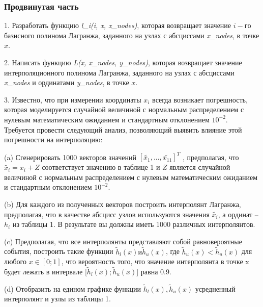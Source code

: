 \subsubsection*{Продвинутая часть}
\begin{flushleft}
1. Разработать функцию \textit{l_i(i, x, x_nodes)}, которая возвращает значение $i-го$ базисного полинома Лагранжа, заданного на узлах с абсциссами \textit{x_nodes}, в точке  $x$.  \end{flushleft}
\begin{flushleft}
2. Написать функцию \textit{L(x, x_nodes, y_nodes)}, которая возвращает значение интерполяционного полинома Лагранжа, заданного на узлах с абсциссами \textit{x_nodes} и ординатами \textit{y_nodes}, в точке $x$.    
\end{flushleft}
\begin{flushleft}
3. Известно, что при измерении координаты $x_i$ всегда возникает погрешность, которая моделируется случайной величиной с нормальным распределением с нулевым математическим ожиданием и стандартным отклонением $10^{-2}$. Требуется провести следующий анализ, позволяющий выявить влияние этой погрешности на интерполяцию:
\end{flushleft}
\begin{flushleft}
(a) Сгенерировать 1000 векторов значений $[\tilde{x_1}, ..., \tilde{x_{11}}]^T$ , предполагая, что $\tilde{x_i} = x_i + Z$ соответствует значению в таблице 1 и $Z$ является случайной величиной с нормальным распределением с нулевым математическим ожиданием и стандартным отклонением $10^{-2}$.
\end{flushleft}
\begin{flushleft}
(b) Для каждого из полученных векторов построить интерполянт Лагранжа, предполагая, что в качестве абсцисс узлов используются значения $\tilde{x_i}$, а ординат – $h_i$ из таблицы 1. В результате вы должны иметь 1000 различных интерполянтов.
\end{flushleft}
\begin{flushleft}
(c) Предполагая, что все интерполянты представляют собой равновероятные события, построить такие функции $\tilde{h}_l(x) и \tilde{h}_u(x)$, где $\tilde{h}_u(x) < \tilde{h}_u(x)$ для любого $x\in[0;1]$, что вероятность того, что значение интерполянта в точке x будет лежать в интервале [$\tilde{h}_l(x);\tilde{h}_u(x)$] равна 0.9.
\end{flushleft}
\begin{flushleft}
(d) Отобразить на едином графике функции $\tilde{h}_l(x), \tilde{h}_u(x)$ усредненный интерполянт и узлы из таблицы 1.
\end{flushleft}
